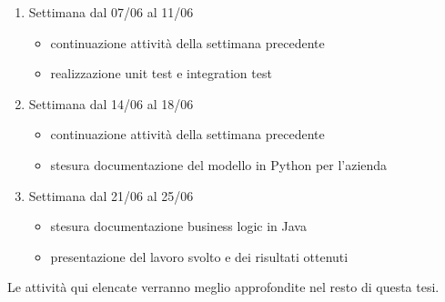 \begin{enumerate}
    \item Settimana dal 07/06 al 11/06
    \begin{itemize}
        \item continuazione attività della settimana precedente
        \item realizzazione unit test e integration test
    \end{itemize}
    
    \item Settimana dal 14/06 al 18/06
    \begin{itemize}
        \item continuazione attività della settimana precedente
        \item stesura documentazione del modello in Python per l'azienda
    \end{itemize}
    
    \item Settimana dal 21/06 al 25/06
    \begin{itemize}
        \item stesura documentazione business logic in Java
        \item presentazione del lavoro svolto e dei risultati ottenuti
    \end{itemize}
\end{enumerate}
Le attività qui elencate verranno meglio approfondite nel resto di questa tesi.